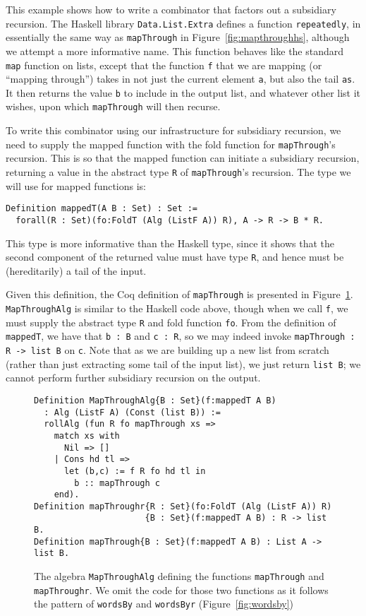 \documentclass[a4paper,USenglish]{lipics-v2021}
\begin{document}
This example shows how to write a combinator that factors out a
subsidiary recursion.  The Haskell library \verb|Data.List.Extra| defines
a function \verb|repeatedly|, in essentially the same way as \verb|mapThrough| in
Figure~\ref{fig:mapthroughhs}, although we attempt a more informative
name.  This function behaves like the standard \verb|map| function on lists, except
that the function \verb|f| that we are mapping (or ``mapping
through'') takes in not just the current element \verb|a|, but also
the tail \verb|as|.  It then returns the value \verb|b| to include in
the output list, and whatever other list it wishes, upon which
\verb|mapThrough| will then recurse.

To write this combinator using our infrastructure for subsidiary
recursion, we need to supply the mapped function with the fold
function for \verb|mapThrough|'s recursion.  This is so that the
mapped function can initiate a subsidiary recursion, returning a value
in the abstract type \verb|R| of \verb|mapThrough|'s recursion.
The type we will use for mapped functions is:
\begin{verbatim}
Definition mappedT(A B : Set) : Set :=
  forall(R : Set)(fo:FoldT (Alg (ListF A)) R), A -> R -> B * R.
\end{verbatim}
\noindent This type is more informative than the Haskell type,
since it shows that the second component of the returned value
must have type \verb|R|, and hence must be (hereditarily) a tail
of the input.

Given this definition, the Coq definition of \verb|mapThrough| is
presented in Figure~\ref{fig:mapthrough}.  \verb|MapThroughAlg| is
similar to the Haskell code above, though when we call \verb|f|, we
must supply the abstract type \verb|R| and fold function \verb|fo|.
From the definition of \verb|mappedT|, we have that \verb|b : B| and
\verb|c : R|, so we may indeed invoke \verb|mapThrough : R -> list B|
on \verb|c|.  Note that as we are building up a new list from scratch
(rather than just extracting some tail of the input list), we just
return \verb|list B|; we cannot perform further subsidiary recursion
on the output.

\begin{figure}
\begin{verbatim}
Definition MapThroughAlg{B : Set}(f:mappedT A B)
  : Alg (ListF A) (Const (list B)) :=
  rollAlg (fun R fo mapThrough xs =>
    match xs with
      Nil => []
    | Cons hd tl =>
      let (b,c) := f R fo hd tl in
        b :: mapThrough c
    end).
Definition mapThroughr{R : Set}(fo:FoldT (Alg (ListF A)) R)
                      {B : Set}(f:mappedT A B) : R -> list B.
Definition mapThrough{B : Set}(f:mappedT A B) : List A -> list B.
\end{verbatim}
\caption{The algebra \texttt{MapThroughAlg} defining the functions
  \texttt{mapThrough} and \texttt{mapThroughr}. We omit the code for
  those two functions as it follows the pattern of \texttt{wordsBy} and \texttt{wordsByr} (Figure~\ref{fig:wordsby})}
\label{fig:mapthrough}
\end{figure}
\end{document}
